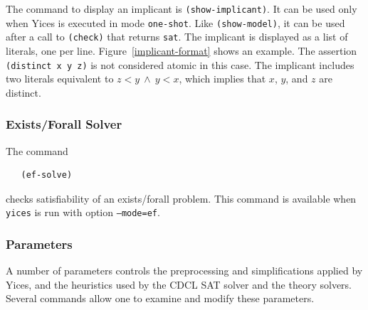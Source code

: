 \documentclass[11pt,twoside,fleqn,openright,titlepage]{cslreport}
\begin{document}
\medskip\noindent The command to display an implicant is
\texttt{(show-implicant)}. It can be used only when Yices is executed
in mode \texttt{one-shot}. Like \texttt{(show-model)}, it can be used
after a call to \texttt{(check)} that returns \texttt{sat}. The
implicant is displayed as a list of literals, one per
line. Figure~\ref{implicant-format} shows an example. The assertion
\texttt{(distinct x y z)} is not considered atomic in this case. The
implicant includes two literals equivalent to $z < y\ \wedge\ y < x$,
which implies that $x$, $y$, and $z$ are distinct.


\subsubsection*{Exists/Forall Solver}

The command
\begin{small}
\begin{verbatim}
   (ef-solve)
\end{verbatim}
\end{small}
checks satisfiability of an exists/forall problem. This command is
available when \texttt{yices} is run with option \texttt{--mode=ef}.


\subsubsection*{Parameters}

A number of parameters controls the preprocessing and simplifications
applied by Yices, and the heuristics used by the CDCL SAT solver and
the theory solvers. Several commands allow one to examine and modify
these parameters.
\end{document}
